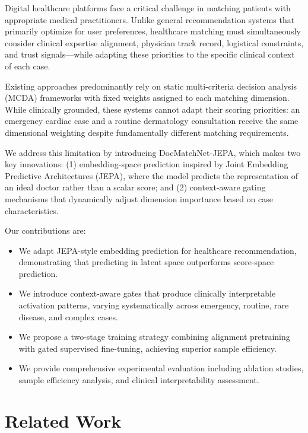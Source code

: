 \documentclass[journal]{IEEEtran}
\begin{document}
Digital healthcare platforms face a critical challenge in matching
patients with appropriate medical practitioners. Unlike general
recommendation systems that primarily optimize for user preferences,
healthcare matching must simultaneously consider clinical expertise
alignment, physician track record, logistical constraints, and trust
signals---while adapting these priorities to the specific clinical
context of each case.

Existing approaches predominantly rely on static multi-criteria
decision analysis (MCDA) frameworks with fixed weights assigned to
each matching dimension. While clinically grounded, these systems
cannot adapt their scoring priorities: an emergency cardiac case
and a routine dermatology consultation receive the same dimensional
weighting despite fundamentally different matching requirements.

We address this limitation by introducing DocMatchNet-JEPA, which
makes two key innovations: (1) embedding-space prediction inspired
by Joint Embedding Predictive Architectures (JEPA), where the model
predicts the representation of an ideal doctor rather than a scalar
score; and (2) context-aware gating mechanisms that dynamically
adjust dimension importance based on case characteristics.

Our contributions are:
\begin{itemize}
\item We adapt JEPA-style embedding prediction for healthcare
recommendation, demonstrating that predicting in latent space
outperforms score-space prediction.
\item We introduce context-aware gates that produce clinically
interpretable activation patterns, varying systematically across
emergency, routine, rare disease, and complex cases.
\item We propose a two-stage training strategy combining alignment
pretraining with gated supervised fine-tuning, achieving superior
sample efficiency.
\item We provide comprehensive experimental evaluation including
ablation studies, sample efficiency analysis, and clinical
interpretability assessment.
\end{itemize}

\section{Related Work}
\end{document}
